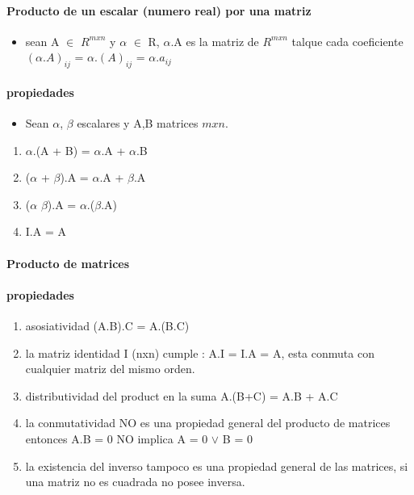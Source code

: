 \documentclass[a4paper]{article}
\begin{document}
\paragraph{Producto de un escalar (numero real) por una matriz}

\begin{itemize}
 \item sean A $\in$ $R^{mxn}$ y $\alpha$ $\in$ R, $\alpha$.A es la matriz de $R^{mxn}$ talque cada coeficiente $(\alpha.A)_{ij}$ = $\alpha$.$(A)_{ij}$ = $\alpha.a_{ij}$  
\end{itemize}	

\paragraph{propiedades}
\begin{itemize}
	\item Sean $\alpha$, $\beta$ escalares y A,B matrices $mxn$.
\end{itemize}

\begin{enumerate}
	\item $\alpha$.(A + B) = $\alpha$.A + $\alpha$.B
	\item ($\alpha$ + $\beta$).A = $\alpha$.A + $\beta$.A
	\item ($\alpha$ $\beta$).A = $\alpha$.($\beta$.A)
	\item I.A = A
\end{enumerate}

\paragraph{Producto de matrices}

\paragraph{propiedades}
\begin{enumerate}
	\item asosiatividad (A.B).C = A.(B.C)
	\item la matriz identidad I (nxn) cumple : A.I = I.A = A, esta conmuta con cualquier matriz del mismo orden.
	\item distributividad del product en la suma A.(B+C) = A.B + A.C 
	\item la conmutatividad NO es una propiedad general del producto de matrices entonces A.B = 0 NO implica A = 0 $\vee$ B = 0
	\item la existencia del inverso tampoco es una propiedad general de las matrices, si una matriz no es cuadrada no posee inversa.
\end{enumerate}
\end{document}
